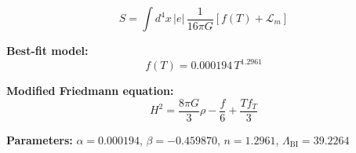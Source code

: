 
\begin{equation}
  S = \int d^4x \, |e| \, \frac{1}{16\pi G} \left[ f(T) + \mathcal{L}_m \right]
\end{equation}

\textbf{Best-fit model:}
\begin{equation}
  f(T) = 0.000194 \, T^{1.2961}
\end{equation}

\textbf{Modified Friedmann equation:}
\begin{equation}
  H^2 = \frac{8\pi G}{3} \rho - \frac{f}{6} + \frac{T f_T}{3}
\end{equation}

\textbf{Parameters:}
$\alpha = 0.000194$, \quad
$\beta = -0.459870$, \quad
$n = 1.2961$, \quad
$\Lambda_{\text{BI}} = 39.2264$